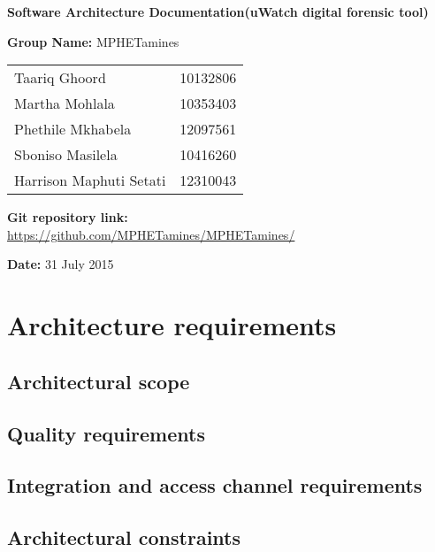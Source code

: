 \documentclass[a4paper,12pt]{article}
\begin{document}
\begin{center}

\Huge\textbf{Software Architecture Documentation(uWatch digital forensic tool)\\}
																											
\vspace{2 cm}

\LARGE\textbf{Group Name:} MPHETamines\newline
 
 
 
 
 
\vspace{0.5 cm}
\begin{tabular}{lr}
Taariq Ghoord&10132806
\\ 
Martha Mohlala&10353403
\\
Phethile Mkhabela&12097561
\\
Sboniso Masilela&10416260
\\
Harrison Maphuti Setati&12310043\\
\end{tabular}

\vspace{1cm}
\textbf{Git repository link:\\}
\url{https://github.com/MPHETamines/MPHETamines/}

\vspace{1cm}
\textbf{Date:} 31 July 2015
\end{center}
\newpage

\tableofcontents

\newpage
{}

\section{Architecture requirements}
\subsection{Architectural scope}
\subsection{Quality requirements}
\subsection{Integration and access channel requirements}
\subsection{Architectural constraints}
\end{document}
